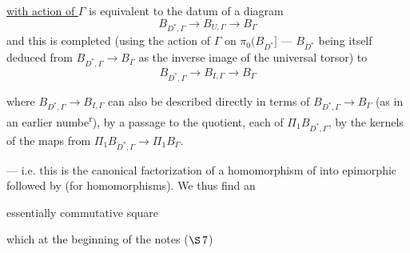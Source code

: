 
\uline{with action of $\Gamma$} is equivalent to the datum
of a diagram
\[
 B_{D^*,\Gamma}\longrightarrow B_{U,\Gamma}\longrightarrow B_\Gamma
\]
and this is completed (using
the action of $\Gamma$ on $\pi_0(B_{D^*}]$ ---
$B_{D^*}$ being itself deduced from $B_{D^*,\Gamma}\longrightarrow B_\Gamma$
as the inverse image of the
universal torsor)  to
\[
 B_{D^*,\Gamma}\longrightarrow B_{I,\Gamma}\longrightarrow B_\Gamma
\]

 where $B_{D^*,\Gamma}\longrightarrow B_{I,\Gamma}$ can also be
described directly in terms of
$B_{D^*,\Gamma}\longrightarrow B_\Gamma$ (as in an earlier numbe\textsuperscript{r}),
by a passage to the
quotient,  each 
of $\Pi_1 B_{D^*,\Gamma}$, by the kernels of the maps
 from $\Pi_1 B_{D^*,\Gamma}\longrightarrow\Pi_1 B_\Gamma$.

--- i.e. this is the canonical factorization
of a homomorphism of 
into \unsure{(} epimorphic
 \unsure{)} followed by 
(for homomorphisms). We thus find an


essentially commutative square

which 
at the beginning of the notes  \deleted{\unsure{$\Pi$}}  ($\S\,7$)

